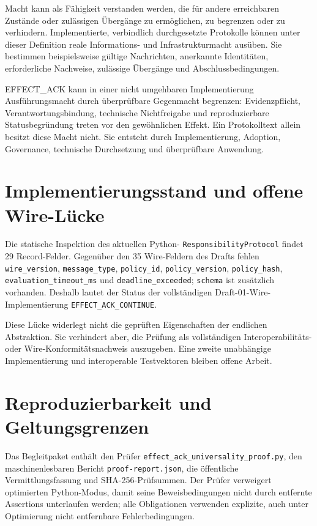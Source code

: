 \documentclass[11pt,a4paper]{article}
\newcommand{\CONTINUE}{\texttt{EFFECT\_ACK\_CONTINUE}}
\begin{document}
Macht kann als Fähigkeit verstanden werden, die für andere erreichbaren
Zustände oder zulässigen Übergänge zu ermöglichen, zu begrenzen oder zu
verhindern. Implementierte, verbindlich durchgesetzte Protokolle können unter
dieser Definition reale Informations- und Infrastrukturmacht ausüben. Sie
bestimmen beispielsweise gültige Nachrichten, anerkannte Identitäten,
erforderliche Nachweise, zulässige Übergänge und Abschlussbedingungen.

EFFECT\_ACK kann in einer nicht umgehbaren Implementierung Ausführungsmacht
durch überprüfbare Gegenmacht begrenzen: Evidenzpflicht,
Verantwortungsbindung, technische Nichtfreigabe und reproduzierbare
Statusbegründung treten vor den gewöhnlichen Effekt. Ein Protokolltext allein
besitzt diese Macht nicht. Sie entsteht durch Implementierung, Adoption,
Governance, technische Durchsetzung und überprüfbare Anwendung.

\section{Implementierungsstand und offene Wire-Lücke}

Die statische Inspektion des aktuellen Python-
\texttt{ResponsibilityProtocol} findet 29 Record-Felder. Gegenüber den 35
Wire-Feldern des Drafts fehlen
\texttt{wire\_version}, \texttt{message\_type}, \texttt{policy\_id},
\texttt{policy\_version}, \texttt{policy\_hash},
\texttt{evaluation\_timeout\_ms} und \texttt{deadline\_exceeded};
\texttt{schema} ist zusätzlich vorhanden. Deshalb lautet der Status der
vollständigen Draft-01-Wire-Implementierung \CONTINUE.

Diese Lücke widerlegt nicht die geprüften Eigenschaften der endlichen
Abstraktion. Sie verhindert aber, die Prüfung als vollständigen
Interoperabilitäts- oder Wire-Konformitätsnachweis auszugeben. Eine zweite
unabhängige Implementierung und interoperable Testvektoren bleiben offene
Arbeit.

\section{Reproduzierbarkeit und Geltungsgrenzen}

Das Begleitpaket enthält den Prüfer
\texttt{effect\_ack\_universality\_proof.py}, den maschinenlesbaren Bericht
\texttt{proof-report.json}, die öffentliche Vermittlungsfassung und
SHA-256-Prüfsummen. Der Prüfer verweigert optimierten Python-Modus, damit seine
Beweisbedingungen nicht durch entfernte Assertions unterlaufen werden; alle
Obligationen verwenden explizite, auch unter Optimierung nicht entfernbare
Fehlerbedingungen.
\end{document}
